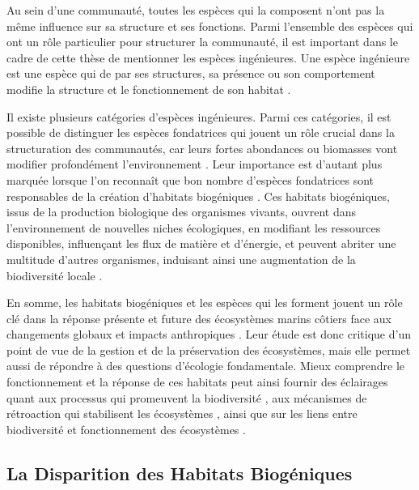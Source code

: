 \begin{refsection}
Au sein d'une communauté, toutes les espèces qui la composent n'ont pas
la même influence sur sa structure et ses fonctions. Parmi l'ensemble
des espèces qui ont un rôle particulier pour structurer la communauté,
il est important dans le cadre de cette thèse de mentionner les espèces
ingénieures. Une espèce ingénieure est une espèce qui de par ses
structures, sa présence ou son comportement modifie la structure et le
fonctionnement de son habitat \autocite{Jones_1994}.

Il existe plusieurs catégories d'espèces ingénieures. Parmi ces
catégories, il est possible de distinguer les espèces fondatrices
\autocite{Dayton_1972} qui jouent un rôle crucial dans la structuration
des communautés, car leurs fortes abondances ou biomasses vont modifier
profondément l'environnement \autocite{Ellison_2019}. Leur importance
est d'autant plus marquée lorsque l'on reconnaît que bon nombre
d'espèces fondatrices sont responsables de la création d'habitats
biogéniques \autocites[ ]{Thomsen_2010}{Thomsen_2018}. Ces habitats
biogéniques, issus de la production biologique des organismes vivants,
ouvrent dans l'environnement de nouvelles niches écologiques, en
modifiant les ressources disponibles, influençant les flux de matière et
d'énergie, et peuvent abriter une multitude d'autres organismes,
induisant ainsi une augmentation de la biodiversité locale \autocites[
]{Bruno_2003}[ ]{Sunday_2017}{Romero_2015}.

En somme, les habitats biogéniques et les espèces qui les forment jouent
un rôle clé dans la réponse présente et future des écosystèmes marins
côtiers face aux changements globaux et impacts anthropiques \autocites[
]{Sunday_2017}[ ]{Harley_2006}{Bulleri_2018}. Leur étude est donc
critique d'un point de vue de la gestion et de la préservation des
écosystèmes, mais elle permet aussi de répondre à des questions
d'écologie fondamentale. Mieux comprendre le fonctionnement et la
réponse de ces habitats peut ainsi fournir des éclairages quant aux
processus qui promeuvent la biodiversité \autocite{Romero_2015}, aux
mécanismes de rétroaction qui stabilisent les écosystèmes
\autocite{Thomsen_2010}, ainsi que sur les liens entre biodiversité et
fonctionnement des écosystèmes \autocite{Hastings_2007}.

\hypertarget{la-disparition-des-habitats-bioguxe9niques}{%
\subsection{La Disparition des Habitats
Biogéniques}\label{la-disparition-des-habitats-bioguxe9niques}}


\end{refsection}
